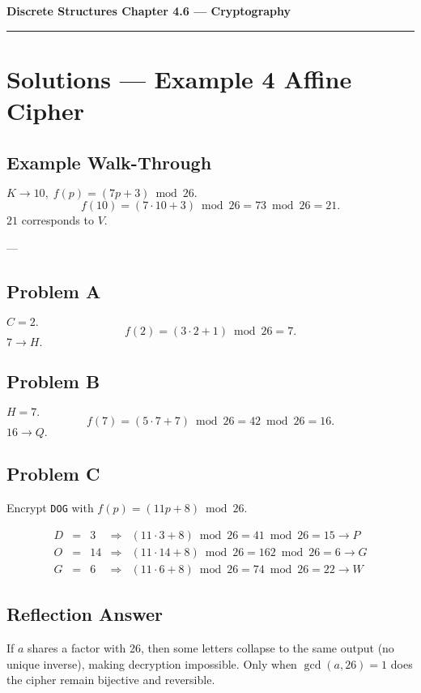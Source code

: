 \documentclass[12pt]{article}
\begin{document}
{\large \textbf{Discrete Structures \quad Chapter 4.6 — Cryptography}}

\hrule
\vspace{0.6em}

\section*{Solutions — Example 4 Affine Cipher}

\subsection*{Example Walk-Through}
\(K\to10,\; f(p)=(7p+3)\bmod26.\)
\[
f(10) = (7\cdot10 + 3)\bmod26 = 73\bmod26 = 21.
\]
\(21\) corresponds to \(V\).  

---

\subsection*{Problem A}
\(C=2.\)
\[
f(2) = (3\cdot2 + 1)\bmod26 = 7.
\]
\(7\rightarrow H.\)

\subsection*{Problem B}
\(H=7.\)
\[
f(7) = (5\cdot7 + 7)\bmod26 = 42\bmod26 = 16.
\]
\(16\rightarrow Q.\)

\subsection*{Problem C}
Encrypt \texttt{DOG} with \(f(p)=(11p+8)\bmod26.\)

\[
\begin{array}{rclcl}
D&=&3 &\Rightarrow& (11\cdot3+8)\bmod26 = 41\bmod26=15\rightarrow P\\
O&=&14&\Rightarrow& (11\cdot14+8)\bmod26 =162\bmod26=6\rightarrow G\\
G&=&6 &\Rightarrow& (11\cdot6+8)\bmod26 =74\bmod26=22\rightarrow W
\end{array}
\]

\subsection*{Reflection Answer}
If \(a\) shares a factor with 26, then some letters collapse to the same output (no unique
inverse), making decryption impossible.  Only when \(\gcd(a,26)=1\) does the cipher remain
bijective and reversible.
\end{document}
